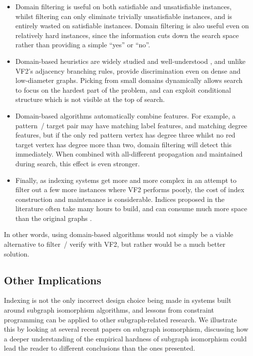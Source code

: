 \documentclass[twoside,11pt]{article}
\begin{document}
\begin{itemize}
    \item Domain filtering is useful on both satisfiable and unsatisfiable instances, whilst
        filtering can only eliminate trivially unsatisfiable instances, and is entirely wasted on
        satisfiable instances. Domain filtering is also useful even on relatively hard instances,
        since the information cuts down the search space rather than providing a simple ``yes'' or
        ``no''.

    \item Domain-based heuristics are widely studied and well-understood
        \cite{DBLP:conf/cp/GentMPSW96}, and unlike VF2's adjacency branching rules, provide
        discrimination even on dense and low-diameter graphs. Picking from small domains dynamically
        allows search to focus on the hardest part of the problem, and can exploit conditional
        structure which is not visible at the top of search.

    \item Domain-based algorithms automatically combine features. For example, a pattern~/ target
        pair may have matching label features, and matching degree features, but if the only red
        pattern vertex has degree three whilst no red target vertex has degree more than two, domain
        filtering will detect this immediately. When combined with all-different propagation and
        maintained during search, this effect is even stronger.

    \item Finally, as indexing systems get more and more complex in an attempt to filter out a few more
        instances where VF2 performs poorly, the cost of index construction and maintenance is
        considerable.  Indices proposed in the literature often take many hours to build, and can
        consume much more space than the original graphs \cite{DBLP:journals/tkde/HongZLY15}.
\end{itemize}

In other words, using domain-based algorithms would not simply be a viable alternative to filter~/
verify with VF2, but rather would be a much better solution.

\subsection{Other Implications}

Indexing is not the only incorrect design choice being made in systems built around
subgraph isomorphism algorithms, and lessons from constraint programming can be applied to other
subgraph-related research. We illustrate this by looking at several recent papers on subgraph
isomorphism, discussing how a deeper understanding of the empirical hardness of subgraph isomorphism
could lead the reader to different conclusions than the ones presented.
\end{document}
